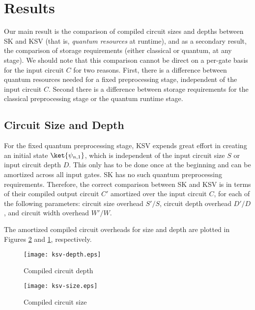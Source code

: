 \section{Results}
\label{sec:results}

Our main result is the comparison of compiled circuit sizes and depths between 
SK and KSV (that is, \emph{quantum resources} at runtime),
and as a secondary result, the comparison of storage requirements (either
classical or quantum, at any stage).
We should note that this comparison cannot be
direct on a per-gate basis for the input circuit $C$ for two reasons.
First, there is a difference between quantum resources needed for a fixed
preprocessing stage, independent of the input circuit $C$. Second there is a
difference between storage requirements for the classical preprocessing stage
or the quantum runtime stage.

\subsection{Circuit Size and Depth}
\label{subsec:results-size-depth}

For the fixed quantum preprocessing stage,
KSV expends great effort in creating an initial state
$\ket{\psi_{n,1}}$, which is independent of the input circuit size $S$ or
input circuit depth $D$.
This only has to be done once at the beginning and can
be amortized across all input gates. SK has no such quantum preprocessing
requirements.
Therefore, the correct comparison between
SK and KSV is in terms of their compiled output circuit $C'$ amortized over
the input circuit $C$, for each of the following parameters:
circuit size overhead $S'/S$,
circuit depth overhead $D'/D$,
and circuit width overhead $W'/W$.

The amortized compiled circuit overheads for size and depth are plotted in
Figures \ref{fig:size} and
\ref{fig:depth}, respectively.

\begin{center}
\begin{figure}[h!]
\label{fig:depth}
\texttt{[image: ksv-depth.eps]}
\caption{Compiled circuit depth}
\end{figure}
\end{center}

\begin{center}
\begin{figure}[h!]
\label{fig:size}
\texttt{[image: ksv-size.eps]}
\caption{Compiled circuit size}
\end{figure}
\end{center}

